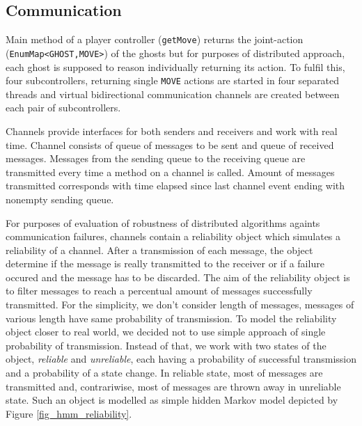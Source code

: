 \subsection{Communication}

Main method of a player controller (\texttt{getMove}) returns the joint-action
(\texttt{EnumMap<GHOST,MOVE>}) of the ghosts
but for purposes of distributed approach, each ghost is supposed to reason individually 
returning its action. To fulfil this, four subcontrollers, returning single \texttt{MOVE}
actions are started in four separated threads and virtual bidirectional communication 
channels are created between each pair of subcontrollers.

Channels provide interfaces for both senders and receivers and work with real time. Channel
consists of queue of messages to be sent and queue of received messages. Messages from the
sending queue to the receiving queue are transmitted every time a method on a channel is
called. Amount of messages transmitted corresponds with time elapsed since last channel event
ending with nonempty sending queue.

For purposes of evaluation of robustness of distributed algorithms againts communication
failures, channels contain a reliability object which simulates a reliability of a channel.
After a transmission of each message, the object determine if the message is really transmitted
to the receiver or if a failure occured and the message has to be discarded. The aim of the
reliability object is to filter messages to reach a percentual amount of messages successfully
transmitted. For the simplicity, we don't consider length of messages, messages of various
length have same probability of transmission. To model the reliability object closer to real
world, we decided not to use simple approach of single probability of transmission. Instead of
that, we work with two states of the object, \emph{reliable} and \emph{unreliable}, each
having a probability of successful transmission and a probability of a state change. In
reliable state, most of messages are transmitted and, contrariwise, most of messages are thrown
away in unreliable state. Such an
object is modelled as simple hidden Markov model depicted by Figure \ref{fig_hmm_reliability}.

